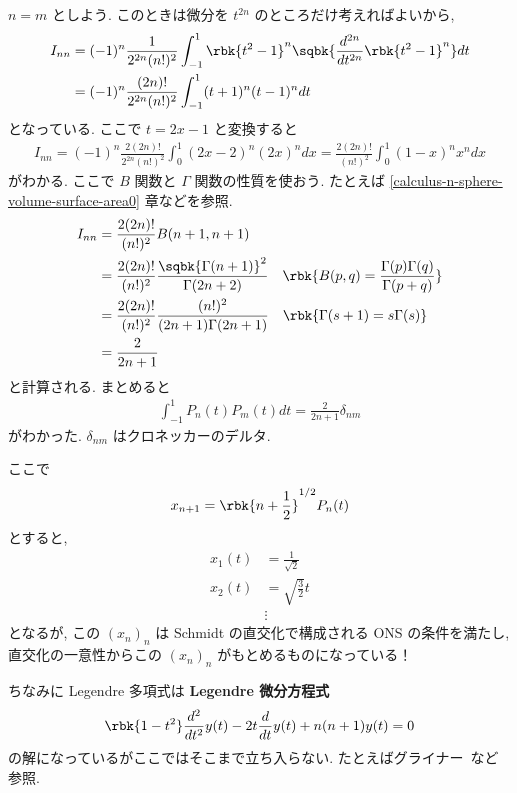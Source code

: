 \documentclass[openany, a4paper, oneside]{jsbook}
\begin{document}
\begin{ex}
$n=m$ としよう.
このときは微分を $t^{2n}$ のところだけ考えればよいから,
\begin{align}
 I_{nn}
 &=
 (-1)^n\frac{1}{2^{2n} (n!)^2} \int_{-1}^1
  \rbk{t^2 - 1}^n
  \sqbk{\frac{d^{2n}}{dt^{2n}} \rbk{t^2 - 1}^n}dt \\
  &=
  (-1)^n \frac{(2n)!}{2^{2n} (n!)^2} \int_{-1}^1
   (t+1)^n(t -1)^n dt
\end{align}
となっている.
ここで $t = 2x -1$ と変換すると
\begin{align}
 I_{nn}
 =
 (-1)^n \frac{2(2n)!}{2^{2n} (n!)^2} \int_0^1
  (2x -2)^n (2x)^n dx
 =
 \frac{2(2n)!}{(n!)^2} \int_0^1
  (1-x)^n x^n dx
\end{align}
がわかる.
ここで $B$ 関数と $\Gamma$ 関数の性質を使おう.
たとえば \ref{calculus-n-sphere-volume-surface-area0} 章などを参照.
\begin{align}
 I_{nn}
 &=
 \frac{2(2n)!}{(n!)^2} B(n+1, n+1) \\
 &=
 \frac{2(2n)!}{(n!)^2} \frac{\sqbk{\Gamma(n+1)}^2}{\Gamma(2n+2)}
 \quad \rbk{B(p, q) = \frac{\Gamma(p) \Gamma(q)}{\Gamma(p+q)}} \\
 &=
 \frac{2(2n)!}{(n!)^2} \frac{(n!)^2}{(2n+1) \Gamma(2n+1)}
 \quad \rbk{\Gamma(s+1) = s \Gamma(s)} \\
 &=
 \frac{2}{2n + 1}
\end{align}
と計算される.
まとめると
\begin{align}
 \int_{-1}^1 P_n(t) P_m(t) dt
 =
 \frac{2}{2n + 1} \delta_{nm}
\end{align}
がわかった.
$\delta_{nm}$ はクロネッカーのデルタ.

ここで
\begin{align}
 x_{n+1}
 =
 \rbk{n+\frac{1}{2}}^{1/2} P_n(t)
\end{align}
とすると,
\begin{align}
 x_1(t)
 &=
 \frac{1}{\sqrt{2}} \\
 x_2(t)
 &=
 \sqrt{\frac{3}{2}} t \\
 &\vdots
\end{align}
となるが, この $(x_n)_n$ は Schmidt の直交化で構成される ONS の条件を満たし,
直交化の一意性からこの $(x_n)_n$ がもとめるものになっている！

ちなみに Legendre 多項式は \textbf{Legendre 微分方程式}
\begin{align}
 \rbk{1 - t^2} \frac{d^2}{dt^2} y(t) - 2t \frac{d}{dt} y(t) + n(n+1) y(t)
 =
 0
\end{align}
の解になっているがここではそこまで立ち入らない.
たとえばグライナー~\cite{WalterGreiner1}など参照.
\end{ex}
\end{document}
